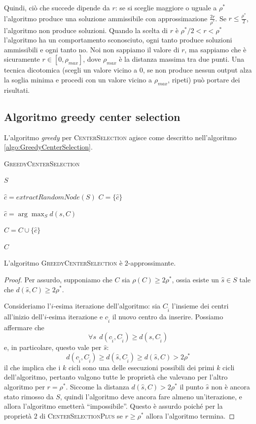 Quindi, ciò che succede dipende da $r$: se si sceglie maggiore o uguale a $\rho^*$
l'algoritmo produce una soluzione ammissibile con approssimazione $\frac{2r}{\rho^*}$.
Se $r \leq \frac{\rho^*}{2}$, l'algoritmo non produce soluzioni. Quando la scelta di
$r$ è $ \rho^*/2 < r < \rho^*$ l'algoritmo ha un comportamento sconosciuto,
ogni tanto produce soluzioni ammissibili e ogni tanto no. Noi non sappiamo il valore
di $r$, ma sappiamo che è sicuramente $r \in [0, \rho_{max}]$, dove $\rho_{max}$
è la distanza massima tra due punti. Una tecnica dicotomica (scegli un valore vicino a $0$,
se non produce nessun output alza la soglia minima e procedi con un valore vicino a $\rho_{max}$,
ripeti) può portare dei risultati.

\subsection{Algoritmo greedy center selection}
L'algoritmo \textit{greedy} per \textsc{CenterSelection} agisce come descritto
nell'algoritmo \ref{algo:GreedyCenterSelection}.
\begin{algorithm}[h]
	\caption{\textsc{GreedyCenterSelection}}
	\label{algo:GreedyCenterSelection}

	{
		\Return $S$
	}

	$\hat{c} = extractRandomNode(S)$
	$C = \{\hat{c}\}$

	{
		$\hat{c} = \arg \max_{S} d(s, C)$

		$C = C \cup \{\hat{c}\}$
	}
	\Return $C$
\end{algorithm}

\begin{theorem}
	L'algoritmo \textsc{GreedyCenterSelection} è $2$-approssimante.
\end{theorem}
\begin{proof}
	Per assurdo, supponiamo che $C$ sia $\rho(C) \geq 2\rho^*$, ossia
	esiste un $\hat{s} \in S$ tale che $d(\hat{s}, C) \geq 2\rho^*$.

	Consideriamo l'$i$-esima iterazione dell'algoritmo: sia $C_{\hat{i}}$ l'insieme
	dei centri all'inizio dell'$i$-esima iterazione e $c_{\hat{i}}$ il nuovo centro
	da inserire. Possiamo affermare che
	$$
		\forall s ~~ d(c_{\hat{i}}, C_{\hat{i}}) \geq d(s, C_{\hat{i}})
	$$
	e, in particolare, questo vale per $\hat{s}$:
	$$
		d(c_{\hat{i}}, C_{\hat{i}}) \geq d(\hat{s}, C_{\hat{i}}) \geq d(\hat{s}, C) > 2\rho^*
	$$
	il che implica che i $k$ cicli sono una delle esecuzioni possibili dei primi
	$k$ cicli dell'algoritmo, pertanto valgono tutte le proprietà che valevano
	per l'altro algoritmo per $r = \rho^*$. Siccome la distanza $d(\hat{s}, C) > 2\rho^*$
	il punto $\hat{s}$ non è ancora stato rimosso da $S$, quindi l'algoritmo deve
	ancora fare almeno un'iterazione, e allora l'algoritmo emetterà ``impossibile''.
	Questo è assurdo poiché per la proprietà $2$ di \textsc{CenterSelectionPlus}
	se $r \geq \rho^*$  allora l'algoritmo termina.

\end{proof}


